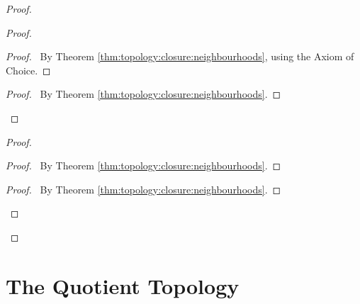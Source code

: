 \documentclass{report}
\let\qed\relax
\theoremstyle{definition}
\begin{document}
  \begin{proof}
    \pf
    \begin{proof}
      \begin{proof}
        \pf\ By Theorem \ref{thm:topology:closure:neighbourhoods}, using the
        Axiom of Choice.
      \end{proof}
      \qedstep
      \begin{proof}
        \pf\ By Theorem \ref{thm:topology:closure:neighbourhoods}.
      \end{proof}
    \end{proof}
    \begin{proof}
      \begin{proof}
        \pf\ By Theorem \ref{thm:topology:closure:neighbourhoods}.
      \end{proof}
      \qedstep
      \begin{proof}
        \pf\ By Theorem \ref{thm:topology:closure:neighbourhoods}.
      \end{proof}
    \end{proof}
    \qed
  \end{proof}

  \section{The Quotient Topology}
\end{document}
